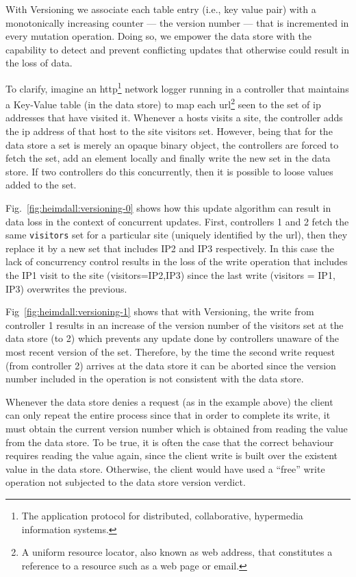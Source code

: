 With Versioning we associate each table entry (i.e., key value pair)  with a monotonically increasing counter --- the version number ---   that is incremented in every mutation operation. 
Doing so, we empower the data store with the capability to detect and prevent conflicting updates that otherwise could result in the loss of data. 

To clarify, imagine an \gls{http}\footnote{The application protocol for distributed, collaborative, hypermedia information systems.} network logger running in a controller that maintains  a Key-Value table  (in the data store) to map each \gls{url}\footnote{A uniform resource locator, also known as web address,  that constitutes a reference to a resource such as a web page or email.} seen to the set of \gls{ip} addresses that have visited it. 
Whenever a hosts visits a site, the controller adds the \gls{ip} address of that host to the site visitors set. 
However, being that  for the data store a set is merely an opaque binary object, the controllers are forced to fetch the set, add an element locally and finally write the new set in the data store. If two controllers do this concurrently, then it is possible to loose values added to the set. 

Fig.~\ref{fig:heimdall:versioning-0} shows how this update algorithm can result in data loss in the context of concurrent updates. 
First, controllers 1 and 2 fetch the same \texttt{visitors} set for a particular site (uniquely identified by the \gls{url}), then they replace it by a new set that includes IP2 and IP3 respectively. 
In this case the lack of concurrency control  results in the loss of the write operation that includes the IP1 visit to the site (visitors={IP2,IP3})  since the  last write (visitors = {IP1, IP3}) overwrites the previous. 

Fig~\ref{fig:heimdall:versioning-1} shows that with Versioning, the write from controller 1 results in an increase of the version number of the visitors set at the data store (to 2) which prevents any update done by controllers unaware of the most recent version of the set. 
Therefore, by the time the second write request (from controller 2) arrives at the data store it can be aborted since  the version number included in the operation is not consistent with the data store. 


Whenever the data store denies a request (as in the example above) the client can only repeat the entire process since that in order to complete its write, it must obtain the current version number which is obtained from reading the value from the data store. 
To be true, it is often the case that the correct behaviour requires reading the value again, since the client write is built over the existent value in the data store. 
Otherwise, the client would have used a ``free'' write operation not subjected to the data store version verdict. 


